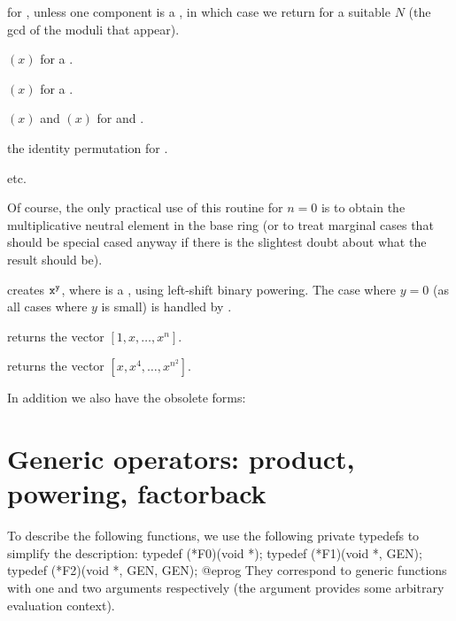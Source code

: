 \item {} for ,  unless one component
is a , in which case we return  for a suitable
$N$ (the gcd of the moduli that appear).

\item {}$(x)$ for a .

\item {}$(x)$ for a .

\item {}$(x)$ and $(x)$ for  and .

\item the identity permutation for .

\item etc.

Of course, the only practical use of this routine for $n = 0$ is
to obtain the multiplicative neutral element in the base ring (or to treat
marginal cases that should be special cased anyway if there is the slightest
doubt about what the result should be).

 creates ${\tt x}^{{\tt y}}$, where  is a
, using left-shift binary powering. The case where $y = 0$
(as all cases where $y$ is small) is handled by .

 returns the vector $[1,x,\dots,x^n]$.

 returns the vector $[x,x^4,\dots,x^{n^2}]$.

In addition we also have the obsolete forms:





\section{Generic operators: product, powering, factorback}

To describe the following functions, we use the following private typedefs
to simplify the description:
\bprog
  typedef (*F0)(void *);
  typedef (*F1)(void *, GEN);
  typedef (*F2)(void *, GEN, GEN);
@eprog
\noindent They correspond to generic functions with one and two arguments
respectively (the  argument provides some arbitrary evaluation
context).

